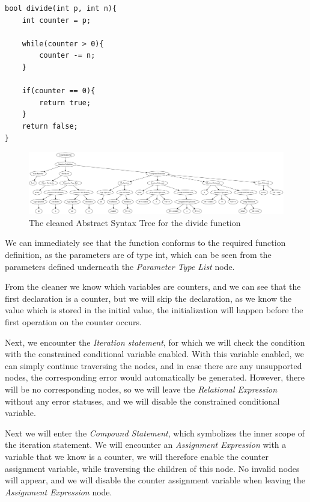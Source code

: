 \documentclass[12pt]{article}
\begin{document}
\begin{lstlisting}[style=CStyle, caption={Example of a ready to evaluate function}, label={lst:ready to eval}]
bool divide(int p, int n){
	int counter = p;
	
	while(counter > 0){
		counter -= n;
	}
	
	if(counter == 0){
		return true;
	}
	return false;
}
\end{lstlisting}

\begin{landscape}
	\vspace*{\fill}
	\begin{figure}[h]
		\centering
		\includegraphics[width=\linewidth]{divide_cleaned}
		\caption{The cleaned Abstract Syntax Tree for the divide function}
		\label{fig:divide_cleaned}
	\end{figure}
	\vspace*{\fill}
\end{landscape}

We can immediately see that the function conforms to the required function definition, as the parameters are of type int, which can be seen from the parameters defined underneath the \textit{Parameter Type List} node.

From the cleaner we know which variables are counters, and we can see that the first declaration is a counter, but we will skip the declaration, as we know the value which is stored in the initial value, the initialization will happen before the first operation on the counter occurs. 

Next, we encounter the \textit{Iteration statement}, for which we will check the condition with the constrained conditional variable enabled. With this variable enabled, we can simply continue traversing the nodes, and in case there are any unsupported nodes, the corresponding error would automatically be generated. However, there will be no corresponding nodes, so we will leave the \textit{Relational Expression} without any error statuses, and we will disable the constrained conditional variable. 

Next we will enter the \textit{Compound Statement}, which symbolizes the inner scope of the iteration statement. We will encounter an \textit{Assignment Expression} with a variable that we know is a counter, we will therefore enable the counter assignment variable, while traversing the children of this node. No invalid nodes will appear, and we will disable the counter assignment variable when leaving the \textit{Assignment Expression} node. 
\end{document}
